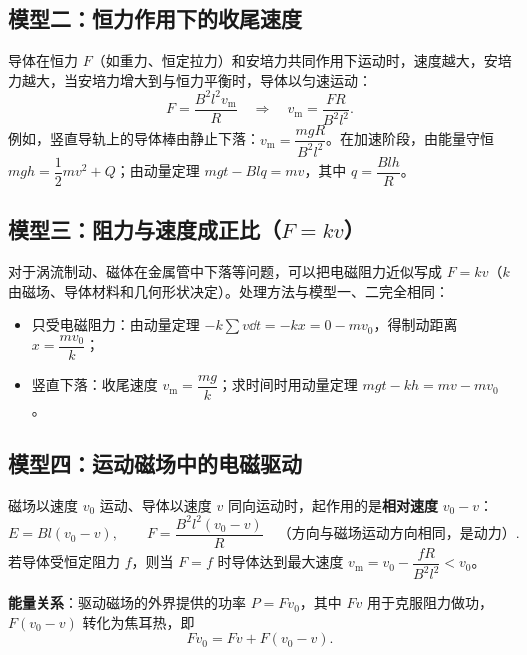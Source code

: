 \subsection{模型二：恒力作用下的收尾速度}

导体在恒力 $F$（如重力、恒定拉力）和安培力共同作用下运动时，速度越大，安培力越大，当安培力增大到与恒力平衡时，导体以匀速运动：
\[F=\frac{B^2l^2v_{\mathrm m}}{R}\quad\Longrightarrow\quad v_{\mathrm m}=\frac{FR}{B^2l^2}.\]
例如，竖直导轨上的导体棒由静止下落：$v_{\mathrm m}=\dfrac{mgR}{B^2l^2}$。在加速阶段，由能量守恒 $mgh=\dfrac12mv^2+Q$；由动量定理 $mgt-Blq=mv$，其中 $q=\dfrac{Blh}{R}$。

\subsection{模型三：阻力与速度成正比（$F=kv$）}

对于涡流制动、磁体在金属管中下落等问题，可以把电磁阻力近似写成 $F=kv$（$k$ 由磁场、导体材料和几何形状决定）。处理方法与模型一、二完全相同：
\begin{itemize}[leftmargin=2.4em,label=\textbullet]
  \item 只受电磁阻力：由动量定理 $-k\sum v\dd t=-kx=0-mv_0$，得制动距离 $x=\dfrac{mv_0}{k}$；
  \item 竖直下落：收尾速度 $v_{\mathrm m}=\dfrac{mg}{k}$；求时间时用动量定理 $mgt-kh=mv-mv_0$。
\end{itemize}
\noindent{}

\subsection{模型四：运动磁场中的电磁驱动}

磁场以速度 $v_0$ 运动、导体以速度 $v$ 同向运动时，起作用的是\textbf{相对速度} $v_0-v$：
\[E=Bl(v_0-v),\qquad F=\frac{B^2l^2(v_0-v)}{R}\quad\text{（方向与磁场运动方向相同，是动力）}.\]
若导体受恒定阻力 $f$，则当 $F=f$ 时导体达到最大速度 $v_{\mathrm m}=v_0-\dfrac{fR}{B^2l^2}<v_0$。

\noindent\textbf{能量关系}：驱动磁场的外界提供的功率 $P=Fv_0$，其中 $Fv$ 用于克服阻力做功，$F(v_0-v)$ 转化为焦耳热，即
\[Fv_0=Fv+F(v_0-v).\]

